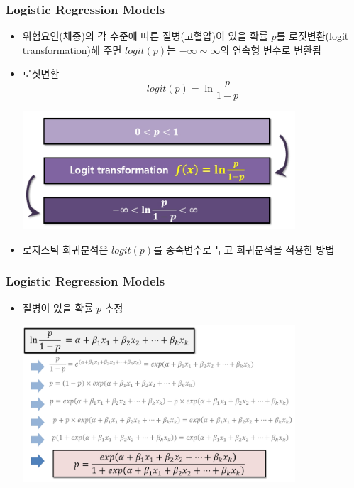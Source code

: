 \documentclass[10pt,xcolor={svgnames},t]{beamer}
\begin{document}
%
%
\begin{frame}
	\frametitle{Logistic Regression Models}
	
	\begin{itemize}
		\item 위험요인(체중)의 각 수준에 따른 질병(고혈압)이 있을 확률 $p$를 로짓변환(logit transformation)해 주면 $logit(p)$는 $-\infty \sim \infty$의 연속형 변수로 변환됨
		\bigskip 
		\item 로짓변환
		\[ logit(p)=\ln \frac{p}{1-p}
		\]
		\begin{center}
			\includegraphics[width=0.8\textwidth]{lo2.jpg}
		\end{center}
		\bigskip
		\item 로지스틱 회귀분석은 $logit(p)$를 종속변수로 두고 회귀분석을 적용한 방법
		
	\end{itemize}
	
	
\end{frame}
%
%
\begin{frame}
	\frametitle{Logistic Regression Models}
	
	\begin{itemize}
		\item 질병이 있을 확률 $p$ 추정
		\begin{center}
			\includegraphics[width=0.8\textwidth]{lo3.jpg}
		\end{center}


		
	\end{itemize}
	
	
\end{frame}
%
\end{document}
